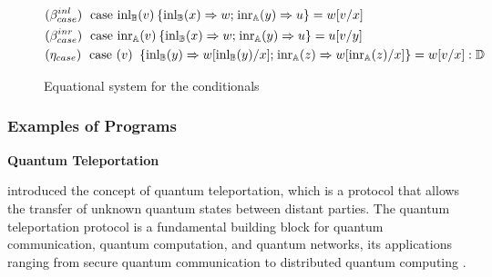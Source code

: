 \documentclass[10pt,a4paper]{amsart}
\theoremstyle{definition}
\theoremstyle{definition}
\theoremstyle{definition}
\theoremstyle{definition}
\theoremstyle{definition}
\theoremstyle{definition}
\begin{document}
  \begin{figure}[h!]
    \centering
    \begin{tcolorbox}[colframe=black, colback=white, boxrule=0.6pt, arc=1pt,boxsep=1pt,top=1pt,bottom=1pt, width=0.85 \textwidth]
    \begin{equation*}
        \begin{split}
          &(\beta_{case}^{inl}) \hspace{3pt} \text{ case } 
          \mathrm{inl}_{\mathbb{B}}(v) \hspace{2pt} \{ \mathrm{inl}_{\mathbb{B}} (x) \Rightarrow w 
          ; \hspace{1pt} \mathrm{inr}_{\mathbb{A}} (y) 
          \Rightarrow u\}= w[v/x]
          \\
          &(\beta_{case}^{inr}) \hspace{3pt} \text{ case } 
          \mathrm{inr}_{\mathbb{A}}(v) \hspace{2pt} \{ \mathrm{inl}_{\mathbb{B}} (x) \Rightarrow w 
          ; \hspace{1pt} \mathrm{inr}_{\mathbb{A}} (y) 
          \Rightarrow u\}= u[v/y]
          \\
          & (\eta_{case}) \hspace{3pt} \text{ case }(v)\ \hspace{2pt} \{\text{inl}_{\mathbb{B}} (y) \Rightarrow w [ \text{inl}_{\mathbb{B}}(y)/x] ; \hspace{1pt} \text{inr}_{\mathbb{A}} (z) \Rightarrow w [ \text{inr}_{\mathbb{A}}(z)/x]\} = w[v/x] : \mathbb{D}
        \end{split}
    \end{equation*}
    \end{tcolorbox}
    \caption{Equational system for the conditionals}
    \label{fig:equations-in-context-cond}
    \end{figure}

    \subsubsection{Examples of Programs}

    \par\vspace{10pt}  
    \textbf{ Quantum Teleportation}


    \cite{bennett1993teleporting} introduced the concept of quantum teleportation, which is a protocol that allows the transfer of   unknown quantum states between distant parties.  The quantum teleportation protocol is a fundamental building block for quantum communication, quantum computation, and quantum networks, its applications ranging
from secure quantum communication to distributed quantum computing \cite{briegel1998quantum,gottesman1999demonstrating,kimble2008quantum}.
\end{document}
